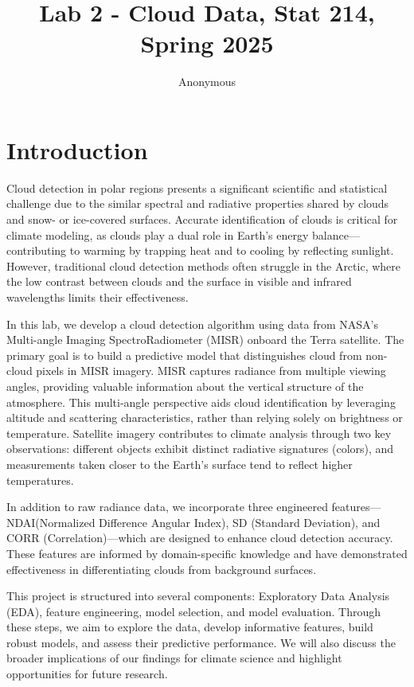 \documentclass[11pt,letterpaper]{article}
\title{Lab 2 - Cloud Data, Stat 214, Spring 2025\vspace{-1em}}
\author{Anonymous}
\begin{document}
\maketitle

\vspace{1em} %
\section{Introduction}
\vspace{0.5em} %

Cloud detection in polar regions presents a significant scientific and statistical challenge due to the similar spectral and radiative properties shared by clouds and snow- or ice-covered surfaces. Accurate identification of clouds is critical for climate modeling, as clouds play a dual role in Earth's energy balance—contributing to warming by trapping heat and to cooling by reflecting sunlight. However, traditional cloud detection methods often struggle in the Arctic, where the low contrast between clouds and the surface in visible and infrared wavelengths limits their effectiveness.

In this lab, we develop a cloud detection algorithm using data from NASA’s Multi-angle Imaging SpectroRadiometer (MISR) onboard the Terra satellite. The primary goal is to build a predictive model that distinguishes cloud from non-cloud pixels in MISR imagery. MISR captures radiance from multiple viewing angles, providing valuable information about the vertical structure of the atmosphere. This multi-angle perspective aids cloud identification by leveraging altitude and scattering characteristics, rather than relying solely on brightness or temperature. Satellite imagery contributes to climate analysis through two key observations: different objects exhibit distinct radiative signatures (colors), and measurements taken closer to the Earth’s surface tend to reflect higher temperatures.

In addition to raw radiance data, we incorporate three engineered features---NDAI(Normalized Difference Angular Index), SD (Standard Deviation), and CORR (Correlation)---which are designed to enhance cloud detection accuracy. These features are informed by domain-specific knowledge and have demonstrated effectiveness in differentiating clouds from background surfaces.

This project is structured into several components: Exploratory Data Analysis (EDA), feature engineering, model selection, and model evaluation. Through these steps, we aim to explore the data, develop informative features, build robust models, and assess their predictive performance. We will also discuss the broader implications of our findings for climate science and highlight opportunities for future research.
\end{document}
